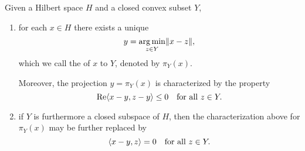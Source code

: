 \begin{namedthm} \label{thm:proj-Hilbert} Given a Hilbert space $H$ and a closed convex subset $Y$,
\begin{enumerate} 
    \item for each $x \in H$ there exists a unique \[
        y = \operatorname*{arg\,min}_{z \in Y} \lVert x - z \rVert,
    \] which we call the  of $x$ to $Y$, denoted by $\pi_Y(x)$.

    Moreover, the projection $y = \pi_Y(x)$ is characterized by the property \begin{equation} \label{eq:proj-cc-set-char}
        \Re \inp{x - y}{z - y} \leq 0\quad\text{for all }z\in Y.
    \end{equation}
    \item if $Y$ is furthermore a closed subspace of $H$, then the characterization above for $\pi_Y(x)$ may be further replaced by \begin{equation} \label{eq:proj-closed-sub-char}
        \inp{x- y}{z} = 0\quad \text{for all }z\in Y.
    \end{equation}
\end{enumerate}
\end{namedthm}
